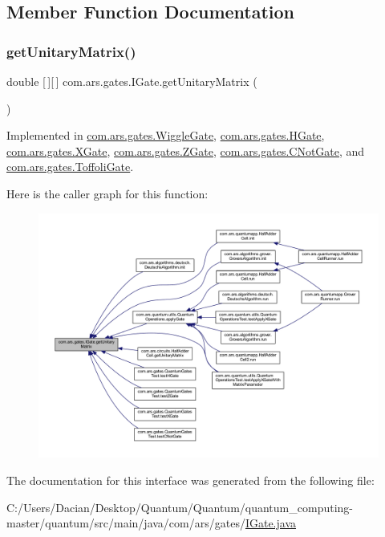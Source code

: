 \subsection{Member Function Documentation}
\hypertarget{interfacecom_1_1ars_1_1gates_1_1_i_gate_a6a940b3a6940cd97429aa211143121cb}{}\label{interfacecom_1_1ars_1_1gates_1_1_i_gate_a6a940b3a6940cd97429aa211143121cb} 
\subsubsection{\texorpdfstring{get\+Unitary\+Matrix()}{getUnitaryMatrix()}}
{\footnotesize\ttfamily double \mbox{[}$\,$\mbox{]}\mbox{[}$\,$\mbox{]} com.\+ars.\+gates.\+I\+Gate.\+get\+Unitary\+Matrix (\begin{DoxyParamCaption}{ }\end{DoxyParamCaption})}



Implemented in \hyperlink{classcom_1_1ars_1_1gates_1_1_wiggle_gate_a1007dd60c814cd64bb6abbd8c3b9e409}{com.\+ars.\+gates.\+Wiggle\+Gate}, \hyperlink{classcom_1_1ars_1_1gates_1_1_h_gate_a4749feb03fafcda241d9f854ef43a0d9}{com.\+ars.\+gates.\+H\+Gate}, \hyperlink{classcom_1_1ars_1_1gates_1_1_x_gate_aa0e495ad8fa7fd0e23ecea6f01c02f6e}{com.\+ars.\+gates.\+X\+Gate}, \hyperlink{classcom_1_1ars_1_1gates_1_1_z_gate_a1009d3144a50f50332e64b6e7f37b578}{com.\+ars.\+gates.\+Z\+Gate}, \hyperlink{classcom_1_1ars_1_1gates_1_1_c_not_gate_a3a78f3ef3d7a418a51b3fabc46954ec5}{com.\+ars.\+gates.\+C\+Not\+Gate}, and \hyperlink{classcom_1_1ars_1_1gates_1_1_toffoli_gate_a0c253237312f11c98ffea807d63f925c}{com.\+ars.\+gates.\+Toffoli\+Gate}.

Here is the caller graph for this function\+:
\nopagebreak
\begin{figure}[H]
\begin{center}
\leavevmode
\includegraphics[width=350pt]{interfacecom_1_1ars_1_1gates_1_1_i_gate_a6a940b3a6940cd97429aa211143121cb_icgraph}
\end{center}
\end{figure}


The documentation for this interface was generated from the following file\+:\begin{DoxyCompactItemize}
\item 
C\+:/\+Users/\+Dacian/\+Desktop/\+Quantum/\+Quantum/quantum\+\_\+computing-\/master/quantum/src/main/java/com/ars/gates/\hyperlink{_i_gate_8java}{I\+Gate.\+java}\end{DoxyCompactItemize}
